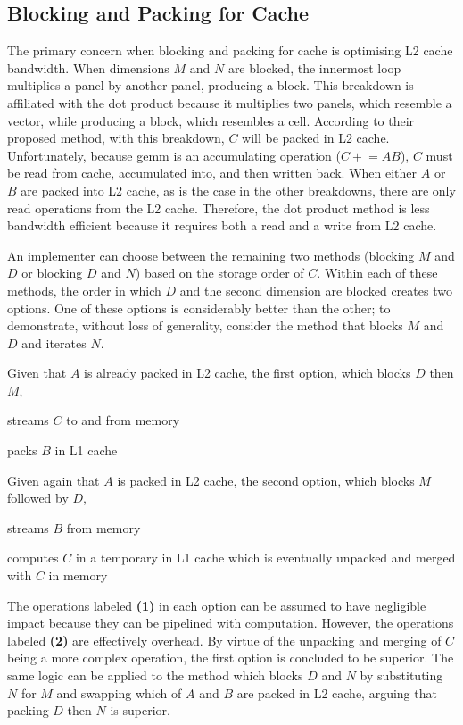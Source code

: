 \documentclass[\main/thesis.tex]{subfiles}
\begin{document}
\subsection{Blocking and Packing for Cache}
\label{sec:blockPack}
The primary concern when blocking and packing for cache is optimising L2 cache bandwidth.
When dimensions $M$ and $N$ are blocked, the innermost loop multiplies a panel by another panel, producing a block.
This breakdown is affiliated with the dot product because it multiplies two panels, which resemble a vector, while producing a block, which resembles a cell.
According to their proposed method, with this breakdown, $C$ will be packed in L2 cache.
Unfortunately, because \gls{gemm} is an accumulating operation (\eg $C \mathrel{+}= AB$), $C$ must be read from cache, accumulated into, and then written back.
When either $A$ or $B$ are packed into L2 cache, as is the case in the other breakdowns, there are only read operations from the L2 cache.
Therefore, the dot product method is less bandwidth efficient because it requires both a read and a write from L2 cache.

An implementer can choose between the remaining two methods (blocking $M$ and $D$ or blocking $D$ and $N$) based on the storage order of $C$.
Within each of these methods, the order in which $D$ and the second dimension are blocked creates two options.
One of these options is considerably better than the other; to demonstrate, without loss of generality, consider the method that blocks $M$ and $D$ and iterates $N$.

Given that $A$ is already packed in L2 cache, the first option, which blocks $D$ then $M$,
\begin{enumerate*}[itemjoin*={{ and }}, label=\textbf{(\arabic*)}, after={.}]
  \item streams $C$ to and from memory
  \item packs $B$ in L1 cache
\end{enumerate*}
Given again that $A$ is packed in L2 cache, the second option, which blocks $M$ followed by $D$,
\begin{enumerate*}[itemjoin*={{ and }}, label=\textbf{(\arabic*)}, after={.}]
  \item streams $B$ from memory
  \item computes $C$ in a temporary in L1 cache which is eventually unpacked and merged with $C$ in memory
\end{enumerate*}
The operations labeled \textbf{(1)} in each option can be assumed to have negligible impact because they can be pipelined with computation.
However, the operations labeled \textbf{(2)} are effectively overhead.
By virtue of the unpacking and merging of $C$ being a more complex operation, the first option is concluded to be superior.
The same logic can be applied to the method which blocks $D$ and $N$ by substituting $N$ for $M$ and swapping which of $A$ and $B$ are packed in L2 cache, arguing that packing $D$ then $N$ is superior.
\end{document}

